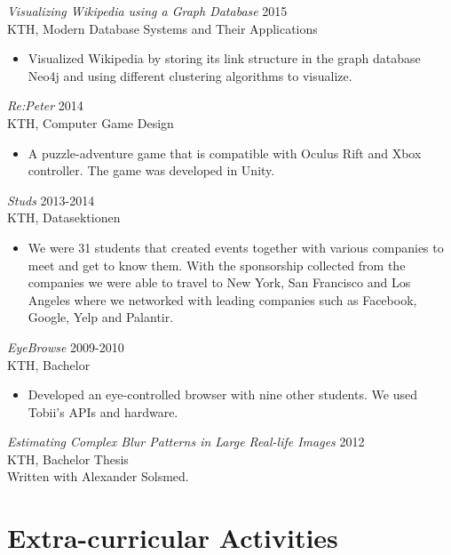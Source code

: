 \documentclass[margin, 10pt]{res} %
\begin{document}
\begin{resume}
{\sl Visualizing Wikipedia using a Graph Database} \hfill 2015 \\
KTH, Modern Database Systems and Their Applications
\begin{itemize} 
\item Visualized Wikipedia by storing its link structure in the graph database Neo4j and using different clustering algorithms to visualize.
\end{itemize} 

{\sl Re:Peter} \hfill 2014 \\
KTH, Computer Game Design
\begin{itemize} 
\item A puzzle-adventure game that is compatible with Oculus Rift and Xbox controller. The game was developed in Unity.
\end{itemize} 

{\sl Studs} \hfill 2013-2014 \\
KTH, Datasektionen
\begin{itemize} 
\item We were 31 students that created events together with various companies to meet and get to know them. With the sponsorship collected from the companies we were able to travel to New York, San Francisco and Los Angeles where we networked with leading companies such as Facebook, Google, Yelp and Palantir.
\end{itemize} 

{\sl EyeBrowse} \hfill 2009-2010 \\
KTH, Bachelor
\begin{itemize} 
\item Developed an eye-controlled browser with nine other students. We used Tobii’s APIs and hardware.
\end{itemize} 

{\sl Estimating Complex Blur Patterns in Large Real-life Images} \hfill 2012 \\
KTH, Bachelor Thesis \\
Written with Alexander Solsmed.



\section{Extra-curricular Activities}


\end{resume}
\end{document}
